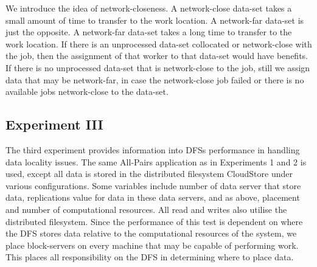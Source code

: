 \documentclass{rspublic}
\begin{document}
We introduce the idea of network-closeness.  A network-close data-set
takes a small amount of time to transfer to the work location.  A
network-far data-set is just the opposite.  A network-far data-set takes
a long time to transfer to the work location.  If there is an
unprocessed data-set collocated or network-close with the job, then the
assignment of that worker to that data-set would have benefits.  If
there is no unprocessed data-set that is network-close to the job, still
we assign data that may be network-far, in case the network-close job
failed or there is no available jobs network-close to the data-set.


\subsection{Experiment III} The third experiment provides information
into DFSs performance in handling data locality issues.  The same
All-Pairs application as in Experiments 1 and 2 is used, except all data
is stored in the distributed filesystem CloudStore under various
configurations.  Some variables include number of data server that store
data, replications value for data in these data servers, and as above,
placement and number of computational resources.  All read and writes
also utilise the distributed filesystem.  Since the performance of this
test is dependent on where the DFS stores data relative to the
computational resources of the system, we place block-servers on every
machine that may be capable of performing work.  This places all
responsibility on the DFS in determining where to place data.
\end{document}
